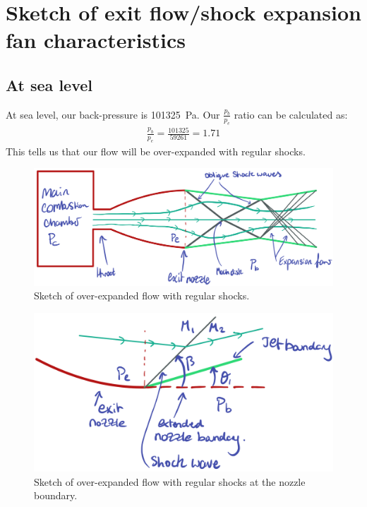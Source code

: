 \documentclass[11pt]{article}
\numberwithin{equation}{section}
\begin{document}
\section{Sketch of exit flow/shock expansion fan characteristics}
\subsection{At sea level}
At sea level, our back-pressure is \SI{101325}{\pascal}. Our $\frac{p_b}{p_e}$ ratio can be calculated as:
\begin{gather}
    \frac{p_b}{p_e} = \frac{101325}{59261} = 1.71
\end{gather}
This tells us that our flow will be over-expanded with regular shocks.
\begin{figure}[H]
    \centering
    \includegraphics[width = \textwidth]{./img/overexpanded1.png}
    \caption{Sketch of over-expanded flow with regular shocks.}
\end{figure}
\begin{figure}[H]
    \centering
    \includegraphics[width = 0.4\paperheight]{./img/overexpanded2.png}
    \caption{Sketch of over-expanded flow with regular shocks at the nozzle boundary.}
\end{figure}
\end{document}
